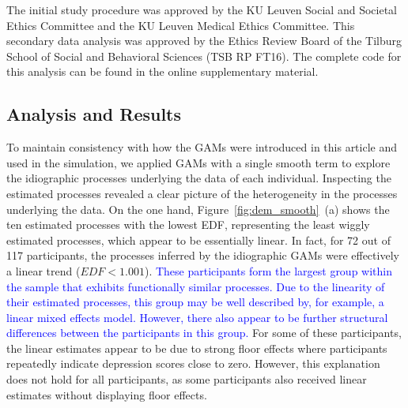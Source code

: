 \documentclass[man, floatsintext]{apa7}
\begin{document}
The initial study procedure was approved by the KU Leuven Social and Societal
Ethics Committee and the KU Leuven Medical Ethics Committee. This secondary
data analysis was approved by the Ethics Review Board of the Tilburg School of
Social and Behavioral Sciences (TSB RP FT16). The complete code for this
analysis can be found in the online supplementary material.

\subsection{Analysis and Results}

To maintain consistency with how the GAMs were introduced in this article and
used in the simulation, we applied GAMs with a single smooth term to explore
the idiographic processes underlying the data of each individual. Inspecting
the estimated processes revealed a clear picture of the heterogeneity in the
processes underlying the data. On the one hand, Figure~\ref{fig:dem_smooth}~(a)
shows the ten estimated processes with the lowest EDF, representing the least
wiggly estimated processes, which appear to be essentially linear. In fact, for
72 out of 117 participants, the processes inferred by the idiographic GAMs were
effectively a linear trend ($EDF < 1.001$). \textcolor{blue}{ These
  participants form the largest group within the sample that exhibits
  functionally
  similar processes. Due to the linearity of their estimated processes, this
  group may be well described by, for example, a linear mixed effects model.
  However, there also appear to be further structural differences between the
  participants in this group.} For some of these participants, the linear
estimates appear to be due to strong floor effects where participants
repeatedly indicate depression scores close to zero. However, this explanation
does not hold for all participants, as some participants also received linear
estimates without displaying floor effects.
\end{document}
